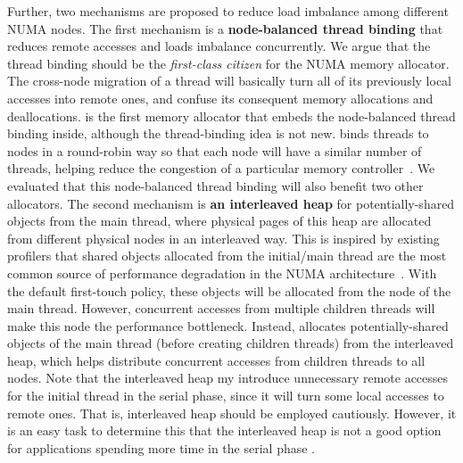 Further, two mechanisms are proposed to reduce load imbalance among different NUMA nodes. The first mechanism is a \textbf{node-balanced thread binding} that reduces remote accesses and loads imbalance concurrently. We argue that the thread binding should be the \textit{first-class citizen} for the NUMA memory allocator. The cross-node migration of a thread will basically turn all of its previously local accesses into remote ones, and confuse its consequent memory allocations and deallocations.  \NM{} is the first memory allocator that embeds the node-balanced thread binding inside, although the thread-binding idea is not new. \NM{} binds threads to nodes in a round-robin way so that each node will have a similar number of threads, helping reduce the congestion of a particular memory controller~\cite{Blagodurov:2011:CNC:2002181.2002182}. We evaluated that this node-balanced thread binding will also benefit two other allocators.  The second mechanism is \textbf{an interleaved heap} for potentially-shared objects from the main thread, where physical pages of this heap are allocated from different physical nodes in an interleaved way. This is inspired by existing profilers that shared objects allocated from the initial/main thread are the most common source of performance degradation in the NUMA architecture~\cite{XULIU, MemProf}. With the default first-touch policy, these objects will be allocated from the node of the main thread. However, concurrent accesses from multiple children threads will make this node the performance bottleneck. Instead, \NM{} allocates potentially-shared objects of the main thread (before creating children threads) from the interleaved heap, which helps distribute concurrent accesses from children threads to all nodes. Note that the interleaved heap my introduce unnecessary remote accesses for the initial thread in the serial phase, since it will turn some local accesses to remote ones. That is, interleaved heap  should be employed cautiously. However, it is an easy task to determine this that the interleaved heap is not a good option for applications spending more time in the serial phase .    

 
